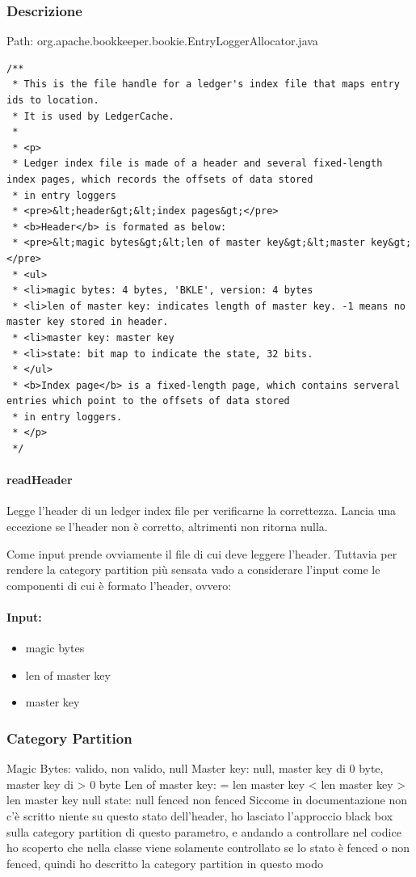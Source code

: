 \documentclass[12pt, a4paper]{article}
\begin{document}
\subsubsection{Descrizione}
Path: org.apache.bookkeeper.bookie.EntryLoggerAllocator.java \\
\begin{verbatim}
/**
 * This is the file handle for a ledger's index file that maps entry ids to location.
 * It is used by LedgerCache.
 *
 * <p>
 * Ledger index file is made of a header and several fixed-length index pages, which records the offsets of data stored
 * in entry loggers
 * <pre>&lt;header&gt;&lt;index pages&gt;</pre>
 * <b>Header</b> is formated as below:
 * <pre>&lt;magic bytes&gt;&lt;len of master key&gt;&lt;master key&gt;</pre>
 * <ul>
 * <li>magic bytes: 4 bytes, 'BKLE', version: 4 bytes
 * <li>len of master key: indicates length of master key. -1 means no master key stored in header.
 * <li>master key: master key
 * <li>state: bit map to indicate the state, 32 bits.
 * </ul>
 * <b>Index page</b> is a fixed-length page, which contains serveral entries which point to the offsets of data stored
 * in entry loggers.
 * </p>
 */
\end{verbatim}

\paragraph{readHeader}
Legge l'header di un ledger index file per verificarne la correttezza.
Lancia una eccezione se l'header non è corretto, altrimenti non ritorna nulla.

Come input prende ovviamente il file di cui deve leggere l'header. Tuttavia per rendere la category partition più sensata
vado a considerare l'input come le componenti di cui è formato l'header, ovvero:
\paragraph{Input:}
\begin{itemize}
  \item magic bytes
  \item len of master key
  \item master key
\end{itemize}

\subsubsection{Category Partition}
Magic Bytes: {valido}, {non valido}, {null}
Master key: {null}, {master key di 0 byte}, {master key di > 0 byte}
Len of master key: { = len master key} {< len master key} {> len master key} {null}
state: {null} {fenced} {non fenced}
Siccome in documentazione non c'è scritto niente su questo stato dell'header, ho lasciato 
l'approccio black box sulla category partition di questo parametro, e andando a controllare nel codice
ho scoperto che nella classe viene solamente controllato se lo stato è fenced o non fenced, quindi ho descritto 
la category partition in questo modo
\end{document}
